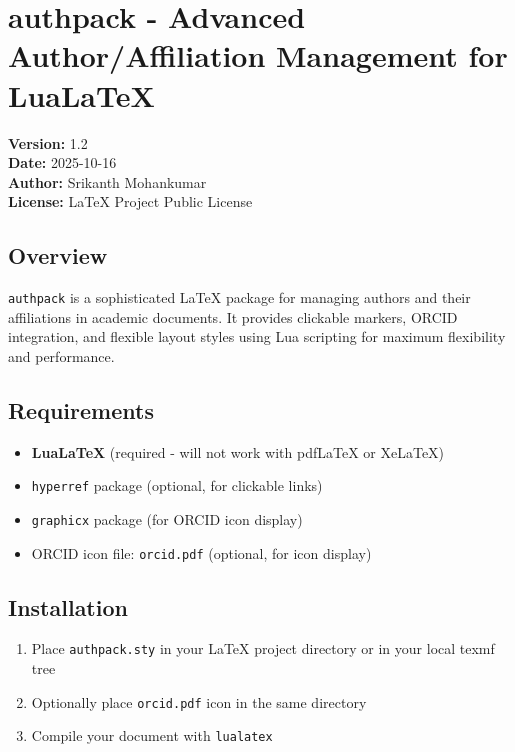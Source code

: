 \documentclass[
]{article}
\author{}
\date{}
\providecommand{\tightlist}{%
  \setlength{\itemsep}{0pt}\setlength{\parskip}{0pt}}
\begin{document}
\hypertarget{authpack---advanced-authoraffiliation-management-for-lualatex}{%
\section{authpack - Advanced Author/Affiliation Management for
LuaLaTeX}\label{authpack---advanced-authoraffiliation-management-for-lualatex}}

\textbf{Version:} 1.2\\
\textbf{Date:} 2025-10-16\\
\textbf{Author:} Srikanth Mohankumar\\
\textbf{License:} LaTeX Project Public License

\hypertarget{overview}{%
\subsection{Overview}\label{overview}}

\texttt{authpack} is a sophisticated LaTeX package for managing authors
and their affiliations in academic documents. It provides clickable
markers, ORCID integration, and flexible layout styles using Lua
scripting for maximum flexibility and performance.

\hypertarget{requirements}{%
\subsection{Requirements}\label{requirements}}

\begin{itemize}
\tightlist
\item
  \textbf{LuaLaTeX} (required - will not work with pdfLaTeX or XeLaTeX)
\item
  \texttt{hyperref} package (optional, for clickable links)
\item
  \texttt{graphicx} package (for ORCID icon display)
\item
  ORCID icon file: \texttt{orcid.pdf} (optional, for icon display)
\end{itemize}

\hypertarget{installation}{%
\subsection{Installation}\label{installation}}

\begin{enumerate}
\def\labelenumi{\arabic{enumi}.}
\tightlist
\item
  Place \texttt{authpack.sty} in your LaTeX project directory or in your
  local texmf tree
\item
  Optionally place \texttt{orcid.pdf} icon in the same directory
\item
  Compile your document with \texttt{lualatex}
\end{enumerate}
\end{document}
